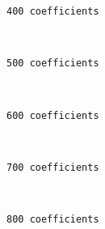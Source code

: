     \begin{Verbatim}[commandchars=\\\{\}]
400 coefficients
    \end{Verbatim}

    \begin{center}
    \end{center}
    { \hspace*{\fill} \\}
    
    \begin{Verbatim}[commandchars=\\\{\}]
500 coefficients
    \end{Verbatim}

    \begin{center}
    \end{center}
    { \hspace*{\fill} \\}
    
    \begin{Verbatim}[commandchars=\\\{\}]
600 coefficients
    \end{Verbatim}

    \begin{center}
    \end{center}
    { \hspace*{\fill} \\}
    
    \begin{Verbatim}[commandchars=\\\{\}]
700 coefficients
    \end{Verbatim}

    \begin{center}
    \end{center}
    { \hspace*{\fill} \\}
    
    \begin{Verbatim}[commandchars=\\\{\}]
800 coefficients
    \end{Verbatim}

    \begin{center}
    \end{center}
    { \hspace*{\fill} \\}
    
